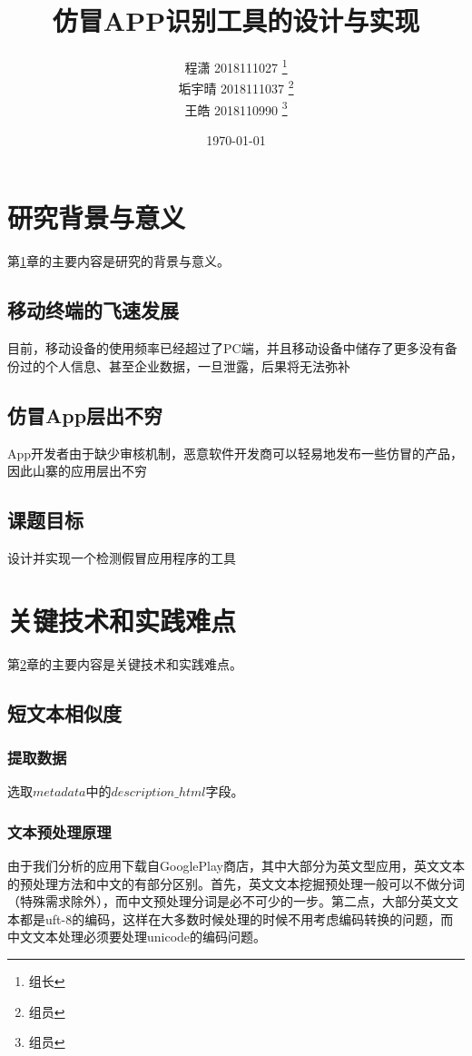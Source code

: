 \documentclass[UTF8,a4paper,10pt, twocolumn]{ctexart}
\title{仿冒APP识别工具的设计与实现}
\author{ 程潇 2018111027  \thanks{组长}\\
垢宇晴 2018111037  \thanks{组员}\\
王皓 2018110990  \thanks{组员}
}
\date{\today}
\begin{document}
    \maketitle
    \thispagestyle{fancy}

\section{研究背景与意义} \label{sec:one}
    第\ref{sec:one}章的主要内容是研究的背景与意义。
\subsection{移动终端的飞速发展}
目前，移动设备的使用频率已经超过了PC端，并且移动设备中储存了更多没有备份过的个人信息、甚至企业数据，一旦泄露，后果将无法弥补

\subsection{仿冒App层出不穷}
App开发者由于缺少审核机制，恶意软件开发商可以轻易地发布一些仿冒的产品，因此山寨的应用层出不穷

\subsection{课题目标}
设计并实现一个检测假冒应用程序的工具

\section{关键技术和实践难点} \label{sec:two}
   第\ref{sec:two}章的主要内容是关键技术和实践难点。
\subsection{短文本相似度}
\subsubsection{提取数据}
选取$metadata$中的$description\_html$字段。

\subsubsection{文本预处理原理}
由于我们分析的应用下载自GooglePlay商店，其中大部分为英文型应用，英文文本的预处理方法和中文的有部分区别。首先，英文文本挖掘预处理一般可以不做分词（特殊需求除外），而中文预处理分词是必不可少的一步。第二点，大部分英文文本都是uft-8的编码，这样在大多数时候处理的时候不用考虑编码转换的问题，而中文文本处理必须要处理unicode的编码问题。
\end{document}
